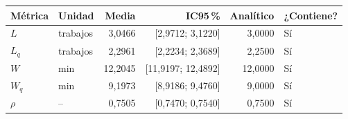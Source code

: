 \begin{tabular}{llrrrl}
\toprule
Métrica & Unidad & Media & IC95\,\% & Analítico & ¿Contiene? \\
\midrule
$L$ & trabajos & 3,0466 & [2,9712; 3,1220] & 3,0000 & Sí \\
$L_q$ & trabajos & 2,2961 & [2,2234; 2,3689] & 2,2500 & Sí \\
$W$ & min & 12,2045 & [11,9197; 12,4892] & 12,0000 & Sí \\
$W_q$ & min & 9,1973 & [8,9186; 9,4760] & 9,0000 & Sí \\
$\rho$ & -- & 0,7505 & [0,7470; 0,7540] & 0,7500 & Sí \\
\bottomrule
\end{tabular}
